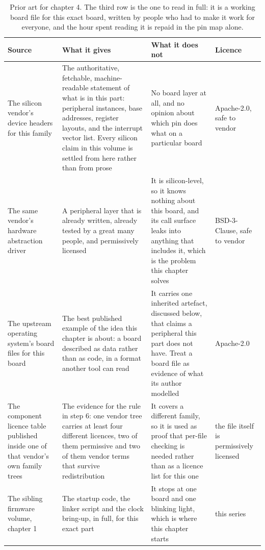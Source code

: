 \begin{table}[H]\centering\small
\begin{tabular}{p{34mm}p{46mm}p{38mm}p{20mm}}
\toprule
Source & What it gives & What it does not & Licence \\
\midrule
The silicon vendor's device headers for this family & The authoritative, fetchable, machine-readable statement of what is in this part: peripheral instances, base addresses, register layouts, and the interrupt vector list. Every silicon claim in this volume is settled from here rather than from prose & No board layer at all, and no opinion about which pin does what on a particular board & Apache-2.0, safe to vendor \\
The same vendor's hardware abstraction driver & A peripheral layer that is already written, already tested by a great many people, and permissively licensed & It is silicon-level, so it knows nothing about this board, and its call surface leaks into anything that includes it, which is the problem this chapter solves & BSD-3-Clause, safe to vendor \\
The upstream operating system's board files for this board & The best published example of the idea this chapter is about: a board described as data rather than as code, in a format another tool can read & It carries one inherited artefact, discussed below, that claims a peripheral this part does not have. Treat a board file as evidence of what its author modelled & Apache-2.0 \\
The component licence table published inside one of that vendor's own family trees & The evidence for the rule in step 6: one vendor tree carries at least four different licences, two of them permissive and two of them vendor terms that survive redistribution & It covers a different family, so it is used as proof that per-file checking is needed rather than as a licence list for this one & the file itself is permissively licensed \\
The sibling firmware volume, chapter 1 & The startup code, the linker script and the clock bring-up, in full, for this exact part & It stops at one board and one blinking light, which is where this chapter starts & this series \\
\bottomrule
\end{tabular}
\caption{Prior art for chapter 4. The third row is the one to read in full: it is a working board file for this exact board, written by people who had to make it work for everyone, and the hour spent reading it is repaid in the pin map alone.}
\end{table}

